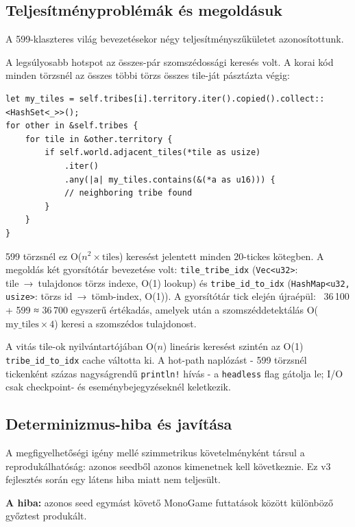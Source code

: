 ﻿\documentclass[a4paper,12pt]{report}
\begin{document}
\subsection*{Teljesítményproblémák és megoldásuk}

A 599-klaszteres világ bevezetésekor négy teljesítményszűkületet azonosítottunk.

A legsúlyosabb hotspot az összes-pár szomszédossági keresés volt.
A korai kód minden törzsnél az összes többi törzs összes tile-ját pásztázta végig:

\begin{lstlisting}[language={},basicstyle=\ttfamily\scriptsize,breaklines=true,caption={Régi all-pairs tile-scan: O(n\textsuperscript{2} × tiles) bottleneck}]
let my_tiles = self.tribes[i].territory.iter().copied().collect::<HashSet<_>>();
for other in &self.tribes {
    for tile in &other.territory {
        if self.world.adjacent_tiles(*tile as usize)
            .iter()
            .any(|a| my_tiles.contains(&(*a as u16))) {
            // neighboring tribe found
        }
    }
}
\end{lstlisting}

599 törzsnél ez O($n^2 \times \text{tiles}$) keresést jelentett minden 20-tickes kötegben.
A megoldás két gyorsítótár bevezetése volt:
\texttt{tile\_tribe\_idx} (\texttt{Vec<u32>}: tile~→~tulajdonos törzs indexe, O(1) lookup)
és \texttt{tribe\_id\_to\_idx} (\texttt{HashMap<u32, usize>}: törzs id~→~tömb-index, O(1)).
A gyorsítótár tick elején újraépül: ~36\,100 + 599 ≈ 36\,700 egyszerű értékadás,
amelyek után a szomszéddetektálás O($\text{my\_tiles} \times 4$) keresi a szomszédos
tulajdonost.

A vitás tile-ok nyilvántartójában O($n$) lineáris keresést szintén az O(1)
\texttt{tribe\_id\_to\_idx} cache váltotta ki.
A hot-path naplózást - 599 törzsnél tickenként százas nagyságrendű \texttt{println!}
hívás - a \texttt{headless} flag gátolja le; I/O csak checkpoint- és eseménybejegyzéseknél
keletkezik.

\subsection*{Determinizmus-hiba és javítása}

A megfigyelhetőségi igény mellé szimmetrikus követelményként társul a reprodukálhatóság:
azonos seedből azonos kimenetnek kell következnie. Ez v3 fejlesztés során
egy látens hiba miatt nem teljesült.

\textbf{A hiba:} azonos seed egymást követő MonoGame futtatások között különböző
győztest produkált.
\end{document}
